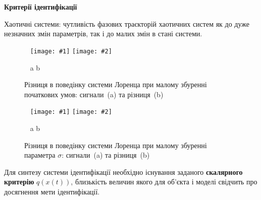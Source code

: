 \documentclass[14pt,handout,utf8]{beamer}
\newcommand{\Xhead}[1]{
 \begin{center}%
      \textbf{#1}%
 \end{center}%
}
\newcommand{\ABlbl}{%
  \vspace{-2.7ex}
  \begin{center}
    ~ \hfill a \hfill\hfill b \hfill ~
  \end{center}
  \vspace{-2.0ex}
}
\newcommand{\PicDouble}[2]{%
 \begin{center}
    ~ \hfill
    \texttt{[image: \#1]}
    \hfill
    \texttt{[image: \#2]}
    \hfill ~
  \end{center}
  \ABlbl
}
\begin{document}



\begin{frame}
  \frametitle{~}

  \Xhead{Критерії ідентифікації}

  Хаотичні системи: чутливість фазових траєкторій
  хаотичних систем як до дуже незначних змін параметрів,
  так і до малих змін в стані системи.

  \begin{figure}
    \PicDouble{../p3/p/lor_diff-p_xx_x0.png}{../p3/p/lor_diff-p_dx_x0.png}
    \caption{Різниця в поведінку системи Лоренца при малому збуренні початкових умов: сигнали~(a) та різниця~(b)}
    \label{atu:f:lor_diff_x0}
  \end{figure}

  \vspace{-5ex}

  \begin{figure}
    \PicDouble{../p3/p/lor_diff-p_xx_sigma.png}{../p3/p/lor_diff-p_dx_sigma.png}
    \caption{Різниця в поведінку системи Лоренца при малому збуренні параметра $\sigma$: сигнали~(a) та різниця~(b)}
    \label{atu:f:lor_diff_sigma}
  \end{figure}

  \vspace{-3ex}

  Для синтезу системи ідентифікації необхідно існування заданого
  \textbf{скалярного критерію} $q(x(t))$, близькість величин якого для об'єкта і моделі
  свідчить про досягнення мети ідентифікації.

\end{frame}

\end{document}
